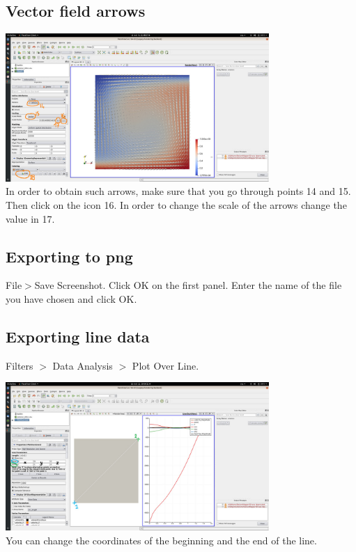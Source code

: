 \subsection*{Vector field arrows}

\begin{center}
\includegraphics[width=10cm]{images/paraview/p10}\\
{\captionfont In order to obtain such arrows, make sure that you go through points 14 and 15.\\ 
Then click on the icon 16. In order to change the scale of the arrows change the value in 17.}
\end{center}


\subsection*{Exporting to png}

File$>$Save Screenshot. Click OK on the first panel. Enter the name of the file you have chosen and click OK.   

\subsection*{Exporting line data}

Filters $>$ Data Analysis $>$ Plot Over Line.  

\begin{center}
\includegraphics[width=10cm]{images/paraview/p13}\\
{\captionfont You can change the coordinates of the beginning and the end of the line.} 
\end{center}

